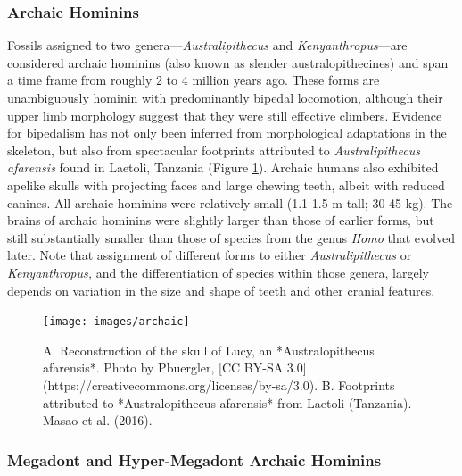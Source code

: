 \documentclass[
]{book}
\begin{document}
\hypertarget{archaic-hominins}{%
\subsubsection*{Archaic Hominins}\label{archaic-hominins}}

Fossils assigned to two genera---\emph{Australipithecus} and \emph{Kenyanthropus}---are considered archaic hominins (also known as slender australopithecines) and span a time frame from roughly 2 to 4 million years ago. These forms are unambiguously hominin with predominantly bipedal locomotion, although their upper limb morphology suggest that they were still effective climbers. Evidence for bipedalism has not only been inferred from morphological adaptations in the skeleton, but also from spectacular footprints attributed to \emph{Australipithecus afarensis} found in Laetoli, Tanzania (Figure \ref{fig:archaic}). Archaic humans also exhibited apelike skulls with projecting faces and large chewing teeth, albeit with reduced canines. All archaic hominins were relatively small (1.1-1.5 m tall; 30-45 kg). The brains of archaic hominins were slightly larger than those of earlier forms, but still substantially smaller than those of species from the genus \emph{Homo} that evolved later. Note that assignment of different forms to either \emph{Australipithecus} or \emph{Kenyanthropus,} and the differentiation of species within those genera, largely depends on variation in the size and shape of teeth and other cranial features.

\begin{figure}
\texttt{[image: images/archaic]} \caption{A. Reconstruction of the skull of Lucy, an *Australopithecus afarensis*. Photo by Pbuergler, [CC BY-SA 3.0](https://creativecommons.org/licenses/by-sa/3.0). B. Footprints attributed to *Australopithecus afarensis* from Laetoli (Tanzania). Masao et al. (2016).}\label{fig:archaic}
\end{figure}

\hypertarget{megadont-and-hyper-megadont-archaic-hominins}{%
\subsubsection*{Megadont and Hyper-Megadont Archaic Hominins}\label{megadont-and-hyper-megadont-archaic-hominins}}
\end{document}
